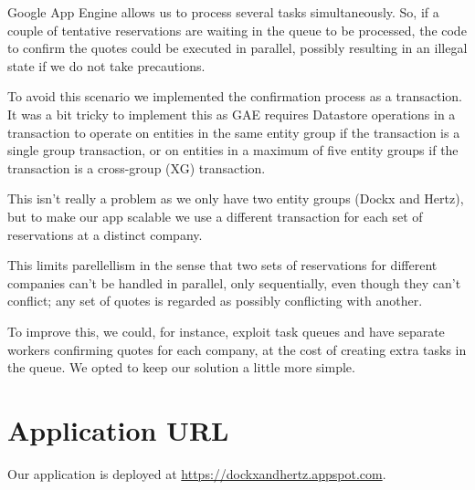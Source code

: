 \documentclass[11pt]{article}
\begin{document}


Google App Engine allows us to process several tasks
simultaneously. So, if a couple of tentative reservations are waiting
in the queue to be processed, the code to confirm the quotes could be
executed in parallel, possibly resulting in an illegal state if we do
not take precautions.

To avoid this scenario we implemented the confirmation process as a
transaction. It was a bit tricky to implement this as GAE requires
Datastore operations in a transaction to operate on entities in the
same entity group if the transaction is a single group transaction, or
on entities in a maximum of five entity groups if the transaction is a
cross-group (XG) transaction.

This isn't really a problem as we only have two entity groups (Dockx
and Hertz), but to make our app scalable we use a different
transaction for each set of reservations at a distinct company.

This limits parellellism in the sense that two sets of reservations
for different companies can't be handled in parallel, only
sequentially, even though they can't conflict; any set of quotes is
regarded as possibly conflicting with another.

To improve this, we could, for instance, exploit task queues and have
separate workers confirming quotes for each company, at the cost of
creating extra tasks in the queue. We opted to keep our solution a
little more simple.

\section*{Application URL}
Our application is deployed at \url{https://dockxandhertz.appspot.com}.
\end{document}

